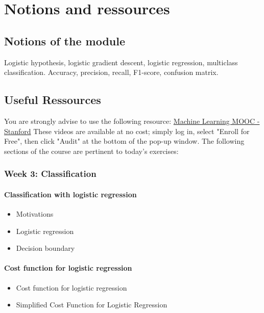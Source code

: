 

\chapter*{Notions and ressources}

\section*{Notions of the module}
Logistic hypothesis, logistic gradient descent, logistic regression, multiclass classification. 
Accuracy, precision, recall, F1-score, confusion matrix.

\section*{Useful Ressources}

You are strongly advise to use the following resource:
\href{https://www.coursera.org/learn/machine-learning}{Machine Learning MOOC - Stanford}
These videos are available at no cost; simply log in, select "Enroll for Free", then click "Audit" at the bottom of the pop-up window.
The following sections of the course are pertinent to today's exercises: 

\subsection*{Week 3: Classification}

\subsubsection*{Classification with logistic regression}
\begin{itemize}
  \item Motivations
  \item Logistic regression
  \item Decision boundary
\end{itemize}

\subsubsection*{Cost function for logistic regression}
\begin{itemize}
  \item Cost function for logistic regression
  \item Simplified Cost Function for Logistic Regression
\end{itemize}

